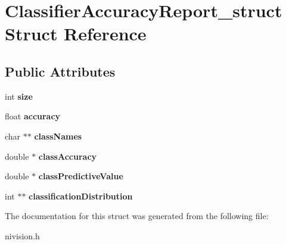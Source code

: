 \hypertarget{structClassifierAccuracyReport__struct}{
\section{ClassifierAccuracyReport\_\-struct Struct Reference}
\label{structClassifierAccuracyReport__struct}
}
\subsection*{Public Attributes}
\begin{DoxyCompactItemize}
\item 
\hypertarget{structClassifierAccuracyReport__struct_a5fb569c3962e436aa92b4c1ab1802b85}{
int {\bfseries size}}
\label{structClassifierAccuracyReport__struct_a5fb569c3962e436aa92b4c1ab1802b85}

\item 
\hypertarget{structClassifierAccuracyReport__struct_a25ae18f9939f7115a3054f15f2563577}{
float {\bfseries accuracy}}
\label{structClassifierAccuracyReport__struct_a25ae18f9939f7115a3054f15f2563577}

\item 
\hypertarget{structClassifierAccuracyReport__struct_a2de244f95be98000b9c4f919017726ba}{
char $\ast$$\ast$ {\bfseries classNames}}
\label{structClassifierAccuracyReport__struct_a2de244f95be98000b9c4f919017726ba}

\item 
\hypertarget{structClassifierAccuracyReport__struct_a1fd960c57dcdc9377f1abd0f407d3f6d}{
double $\ast$ {\bfseries classAccuracy}}
\label{structClassifierAccuracyReport__struct_a1fd960c57dcdc9377f1abd0f407d3f6d}

\item 
\hypertarget{structClassifierAccuracyReport__struct_a255828bd7b7bf3c8b86af7af8f4e9c7b}{
double $\ast$ {\bfseries classPredictiveValue}}
\label{structClassifierAccuracyReport__struct_a255828bd7b7bf3c8b86af7af8f4e9c7b}

\item 
\hypertarget{structClassifierAccuracyReport__struct_abbdee4f3b993ce992c6bbf0b026c7874}{
int $\ast$$\ast$ {\bfseries classificationDistribution}}
\label{structClassifierAccuracyReport__struct_abbdee4f3b993ce992c6bbf0b026c7874}

\end{DoxyCompactItemize}


The documentation for this struct was generated from the following file:\begin{DoxyCompactItemize}
\item 
nivision.h\end{DoxyCompactItemize}
